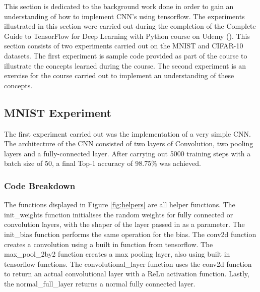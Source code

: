 \documentclass[12pt]{report}
\begin{document}
This section is dedicated to the background work done in order to gain an understanding of how to implement CNN's using tensorflow. The experiments illustrated in this section were carried out during the completion of the Complete Guide to TensorFlow for Deep Learning with Python course on Udemy (\cite{udemy}). This section consists of two experiments carried out on the MNIST and CIFAR-10 datasets. The first experiment is sample code provided as part of the course to illustrate the concepts learned during the course. The second experiment is an exercise for the course carried out to implement an understanding of these concepts.

\subsection{MNIST Experiment}

The first experiment carried out was the implementation of a very simple CNN. The architecture of the CNN consisted of two layers of Convolution, two pooling layers and a fully-connected layer. After carrying out 5000 training steps with a batch size of 50, a final Top-1 accuracy of 98.75\% was achieved.

\subsubsection{Code Breakdown}

\begin{flushleft}
The functions displayed in Figure \ref{fig:helpers} are all helper functions. The init\_weights function initialises the random weights for fully connected or convolution layers, with the shaper of the layer passed in as a parameter. The init\_bias function performs the same operation for the bias. The conv2d function creates a convolution using a built in function from tensorflow. The max\_pool\_2by2 function creates a max pooling layer, also using built in tensorflow functions. The convolutional\_layer function uses the conv2d function to return an actual convolutional layer with a ReLu activation function. Lastly, the normal\_full\_layer returns a normal fully connected layer.
\end{flushleft}
\end{document}
